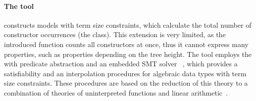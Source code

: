 \paragraph{The \eldarica{} tool~\cite{8603013}} constructs models with term size constraints, which calculate the total number of constructor occurrences (the \sizeelemclass{} class). This extension is very limited, as the introduced function counts all constructors at once, thus it cannot express many properties, such as properties depending on the tree height. The \eldarica{} tool employs the \cegar{} with predicate abstraction and an embedded SMT solver \princess{}~\cite{princess}, which provides a satisfiability and an interpolation procedures for algebraic data types with term size constraints. These procedures are based on the reduction of this theory to a combination of theories of uninterpreted functions and linear arithmetic~\cite{hojjat2017deciding}.

